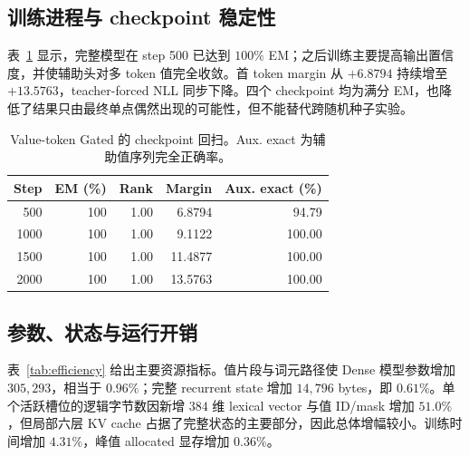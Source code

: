 \documentclass[letterpaper]{article}
\begin{document}
\begin{table}[t]
\centering
\caption{Dense 条件按临时事实数量聚合的结果。每行包含三个延迟条件，共 72 条样本。}
\label{tab:noise}
%
\end{table}

\subsection{训练进程与 checkpoint 稳定性}

表~\ref{tab:checkpoint} 显示，完整模型在 step 500 已达到 $100\%$ EM；之后训练主要提高输出置信度，并使辅助头对多 token 值完全收敛。首 token margin 从 $+6.8794$ 持续增至 $+13.5763$，teacher-forced NLL 同步下降。四个 checkpoint 均为满分 EM，也降低了结果只由最终单点偶然出现的可能性，但不能替代跨随机种子实验。

\begin{table}[t]
\centering
\caption{Value-token Gated 的 checkpoint 回扫。Aux. exact 为辅助值序列完全正确率。}
\label{tab:checkpoint}
\begin{tabular}{rrrrr}
\toprule
Step & EM (\%) & Rank & Margin & Aux. exact (\%)\\
\midrule
500  & 100 & 1.00 & 6.8794  & 94.79\\
1000 & 100 & 1.00 & 9.1122  & 100.00\\
1500 & 100 & 1.00 & 11.4877 & 100.00\\
2000 & 100 & 1.00 & 13.5763 & 100.00\\
\bottomrule
\end{tabular}
\end{table}

\subsection{参数、状态与运行开销}

表~\ref{tab:efficiency} 给出主要资源指标。值片段与词元路径使 Dense 模型参数增加 $305{,}293$，相当于 $0.96\%$；完整 recurrent state 增加 $14{,}796$ bytes，即 $0.61\%$。单个活跃槽位的逻辑字节数因新增 $384$ 维 lexical vector 与值 ID/mask 增加 $51.0\%$，但局部六层 KV cache 占据了完整状态的主要部分，因此总体增幅较小。训练时间增加 $4.31\%$，峰值 allocated 显存增加 $0.36\%$。
\end{document}
